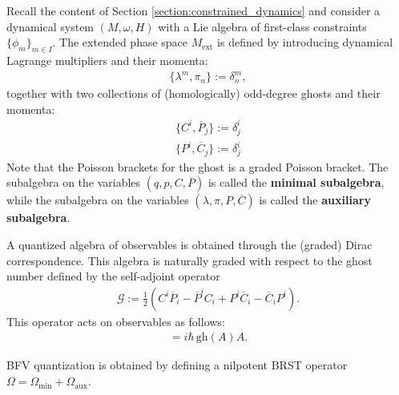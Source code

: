     Recall the content of Section \ref{section:constrained_dynamics} and consider a dynamical system $(M,\omega,H)$ with a Lie algebra of first-class constraints $\{\phi_m\}_{m\in I}$. The extended phase space $M_{\text{ext}}$ is defined by introducing dynamical Lagrange multipliers and their momenta:
    \begin{gather}
        \{\lambda^m,\pi_n\} := \delta^m_n,
    \end{gather}
    together with two collections of (homologically) odd-degree ghosts and their momenta:
    \begin{gather}
        \{C^i,\overline{P}_j\} := \delta^i_j\\
        \{P^i,\overline{C}_j\} := \delta^i_j
    \end{gather}
    Note that the Poisson brackets for the ghost is a graded Poisson bracket. The subalgebra on the variables $(q,p,C,\overline{P})$ is called the \textbf{minimal subalgebra}, while the subalgebra on the variables $(\lambda,\pi,P,\overline{C})$ is called the \textbf{auxiliary subalgebra}.

    A quantized algebra of observables is obtained through the (graded) Dirac correspondence. This algebra is naturally graded with respect to the ghost number defined by the self-adjoint operator
    \begin{gather}
        \mathcal{G} := \frac{1}{2}\left(C^i\overline{P}_i - \overline{P}^iC_i + P^i\overline{C}_i - \overline{C}_iP^i\right).
    \end{gather}
    This operator acts on observables as follows:
    \begin{gather}
        [\mathcal{G},A] = i\hbar\,\text{gh}(A)A.
    \end{gather}

    BFV quantization is obtained by defining a nilpotent BRST operator $\Omega=\Omega_{\text{min}}+\Omega_{\text{aux}}$.